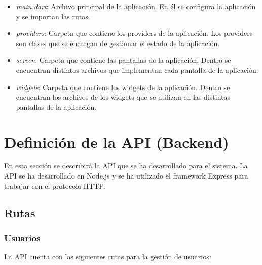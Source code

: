 \begin{itemize}
  \item \textit{main.dart}: Archivo principal de la aplicación. En él se configura la aplicación y se importan las rutas.
  \item \textit{providers}: Carpeta que contiene los providers de la aplicación. Los providers son clases que se encargan de gestionar el estado de la aplicación.
  \item \textit{screen}: Carpeta que contiene las pantallas de la aplicación. Dentro se encuentran distintos archivos que implementan cada pantalla de la aplicación.
  \item \textit{widgets}: Carpeta que contiene los widgets de la aplicación. Dentro se encuentran los archivos de los widgets que se utilizan en las distintas pantallas de la aplicación.
\end{itemize}

\section{Definición de la API (Backend)}
\label{sec:api}
En esta sección se describirá la API que se ha desarrollado para el sistema. La API se ha desarrollado en Node.js y se ha utilizado el framework Express para trabajar con el protocolo HTTP.

\subsection{Rutas}

\subsubsection{Usuarios}
\label{sec:usuarios}
La API cuenta con las siguientes rutas para la gestión de usuarios:

